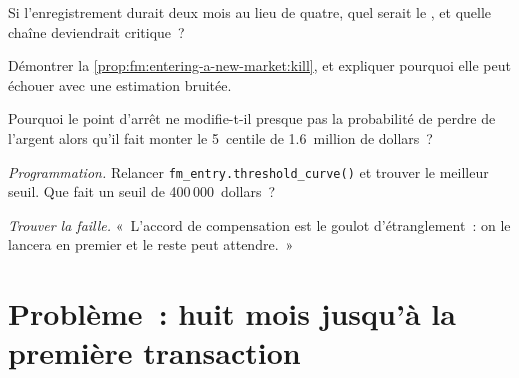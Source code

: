 \begin{exercise}[$\star\star$]\label{exo:fm:entering-a-new-market:4}
Si l'enregistrement durait deux mois au lieu de quatre, quel serait le , et quelle chaîne deviendrait critique~?
\end{exercise}

\begin{exercise}[$\star\star$]\label{exo:fm:entering-a-new-market:5}
Démontrer la \cref{prop:fm:entering-a-new-market:kill}, et expliquer pourquoi elle peut échouer avec une estimation bruitée.
\end{exercise}

\begin{exercise}[$\star\star$]\label{exo:fm:entering-a-new-market:6}
Pourquoi le point d'arrêt ne modifie-t-il presque pas la probabilité de perdre de l'argent alors qu'il fait monter le 5~centile de 1.6~million de dollars~?
\end{exercise}

\begin{exercise}[$\star\star\star$]\label{exo:fm:entering-a-new-market:7}
\emph{Programmation.} Relancer \texttt{fm\_entry.threshold\_curve()} et trouver le meilleur seuil. Que fait un seuil de 400\,000~dollars~?
\end{exercise}

\begin{exercise}[$\star\star\star$]\label{exo:fm:entering-a-new-market:8}
\emph{Trouver la faille.} «~L'accord de compensation est le goulot d'étranglement~: on le lancera en premier et le reste peut attendre.~»
\end{exercise}

\section{Problème~: huit mois jusqu'à la première transaction}

